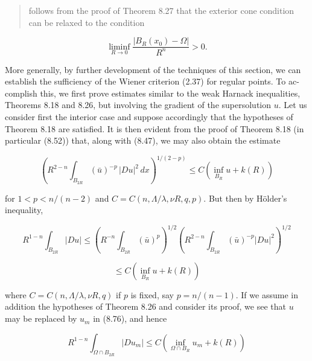 
\begin{quote}
follows from the proof of Theorem 8.27 that the exterior cone condition can be
relaxed to the condition
\end{quote}

\begin{equation}\tag{8.75}
\liminf_{R \to 0} \frac{\left|B_R(x_0)-\Omega\right|}{R^n} > 0.
\end{equation}

\noindent More generally, by further development of the techniques of this section, we can
establish the sufficiency of the Wiener criterion (2.37) for regular points. To ac-
complish this, we first prove estimates similar to the weak Harnack inequalities,
Theorems 8.18 and 8.26, but involving the gradient of the supersolution $u$. Let us
consider first the interior case and suppose accordingly that the hypotheses of
Theorem 8.18 are satisfied. It is then evident from the proof of Theorem 8.18 (in
particular (8.52)) that, along with (8.47), we may also obtain the estimate

\begin{equation*}
\left(
R^{2-n}\int_{B_{2R}} (\bar u)^{-p}\, |Du|^2\,dx
\right)^{1/(2-p)}
\le C \left(\inf_{B_R} u + k(R)\right)
\end{equation*}

\noindent for $1<p<n/(n-2)$ and $C=C(n,\Lambda/\lambda,\nu R,q,p)$. But then by Hölder's inequality,

\begin{equation}\tag{8.76}
R^{1-n}\int_{B_{2R}} |Du|
\le \left(R^{-n}\int_{B_{2R}} (\bar u)^p\right)^{1/2}
\left(R^{2-n}\int_{B_{2R}} (\bar u)^{-p}|Du|^2\right)^{1/2}
\end{equation}

\begin{equation*}
\le C\left(\inf_{B_R} u + k(R)\right)
\end{equation*}

\noindent where $C=C(n,\Lambda/\lambda,\nu R,q)$ if $p$ is fixed, say $p=n/(n-1)$.
If we assume in addition the hypotheses of Theorem 8.26 and consider its proof,
we see that $u$ may be replaced by $u_m$ in (8.76), and hence

\begin{equation}\tag{8.77}
R^{1-n}\int_{\Omega \cap B_{2R}} |Du_m|
\le C\left(\inf_{\Omega\cap B_R} u_m + k(R)\right)
\end{equation}

